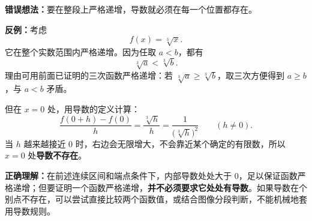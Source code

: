 \begin{trapbox}
\textbf{错误想法：}要在整段上严格递增，导数就必须在每一个位置都存在。

\textbf{反例：}考虑
\[
f(x)=\sqrt[3]{x}.
\]
它在整个实数范围内严格递增。因为任取 $a<b$，都有
\[
\sqrt[3]{a}<\sqrt[3]{b}.
\]
理由可用前面已证明的三次函数严格递增：若 $\sqrt[3]a\ge\sqrt[3]b$，取三次方便得到 $a\ge b$，与 $a<b$ 矛盾。

但在 $x=0$ 处，用导数的定义计算：
\[
\frac{f(0+h)-f(0)}{h}
=\frac{\sqrt[3]{h}}{h}
=\frac{1}{\bigl(\sqrt[3]{h}\bigr)^2}\qquad(h\ne0).
\]
当 $h$ 越来越接近 $0$ 时，右边会无限增大，不会靠近某个确定的有限数，所以 $x=0$ 处\textbf{导数不存在}。

\textbf{正确理解：}在前述连续区间和端点条件下，内部导数处处大于 $0$，足以保证函数严格递增；但要证明一个函数严格递增，\textbf{并不必须要求它处处有导数}。如果导数在个别点不存在，可以尝试直接比较两个函数值，或结合图像分段判断，不能机械地套用导数规则。
\end{trapbox}
